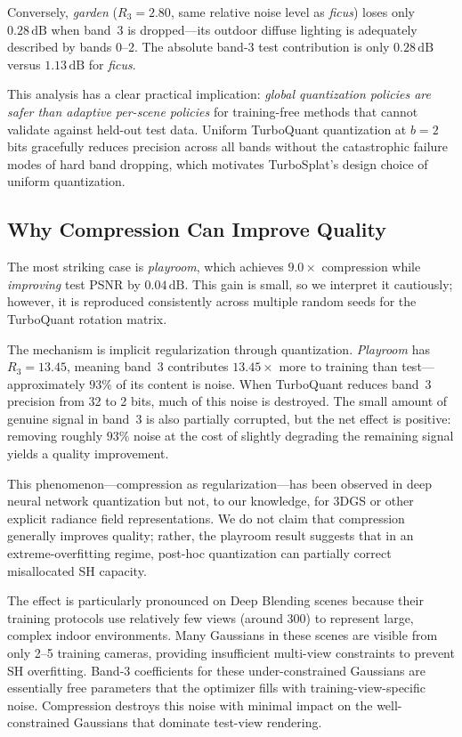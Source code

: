 \documentclass[sigconf,review]{acmart}
\newcommand{\ours}{TurboSplat}
\newcommand{\dB}{\,\text{dB}}
\newcommand{\R}[1]{R_{#1}}
\begin{document}
Conversely, \textit{garden} ($\R{3}{=}2.80$, same relative noise level as \textit{ficus}) loses only $0.28\dB$ when band~3 is dropped---its outdoor diffuse lighting is adequately described by bands 0--2.
The absolute band-3 test contribution is only $0.28\dB$ versus $1.13\dB$ for \textit{ficus}.

This analysis has a clear practical implication: \emph{global quantization policies are safer than adaptive per-scene policies} for training-free methods that cannot validate against held-out test data.
Uniform TurboQuant quantization at $b{=}2$ bits gracefully reduces precision across all bands without the catastrophic failure modes of hard band dropping, which motivates \ours{}'s design choice of uniform quantization.

\subsection{Why Compression Can Improve Quality}
\label{sec:improve}

The most striking case is \textit{playroom}, which achieves $9.0{\times}$ compression while \emph{improving} test PSNR by $0.04\dB$.
This gain is small, so we interpret it cautiously; however, it is reproduced consistently across multiple random seeds for the TurboQuant rotation matrix.

The mechanism is implicit regularization through quantization.
\textit{Playroom} has $\R{3}{=}13.45$, meaning band~3 contributes $13.45{\times}$ more to training than test---approximately $93\%$ of its content is noise.
When TurboQuant reduces band~3 precision from 32 to 2 bits, much of this noise is destroyed.
The small amount of genuine signal in band~3 is also partially corrupted, but the net effect is positive: removing roughly $93\%$ noise at the cost of slightly degrading the remaining signal yields a quality improvement.

This phenomenon---compression as regularization---has been observed in deep neural network quantization but not, to our knowledge, for 3DGS or other explicit radiance field representations.
We do not claim that compression generally improves quality; rather, the playroom result suggests that in an extreme-overfitting regime, post-hoc quantization can partially correct misallocated SH capacity.

The effect is particularly pronounced on Deep Blending scenes because their training protocols use relatively few views (around 300) to represent large, complex indoor environments.
Many Gaussians in these scenes are visible from only 2--5 training cameras, providing insufficient multi-view constraints to prevent SH overfitting.
Band-3 coefficients for these under-constrained Gaussians are essentially free parameters that the optimizer fills with training-view-specific noise.
Compression destroys this noise with minimal impact on the well-constrained Gaussians that dominate test-view rendering.
\end{document}
